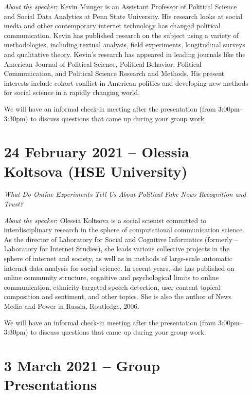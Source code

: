 \documentclass[abstract=on,parskip=full,headings=standardclasses,fontsize=11pt,paper=a4]{scrartcl}
\begin{document}
\textit{About the speaker}: Kevin Munger is an Assistant Professor of Political Science and Social Data Analytics at Penn State University. His research looks at social media and other contemporary internet technology has changed political communication. Kevin has published research on the subject using a variety of methodologies, including textual analysis, field experiments, longitudinal surveys and qualitative theory. Kevin's research has appeared in leading journals like the American Journal of Political Science, Political Behavior, Political Communication, and Political Science Research and Methods. His present interests include cohort conflict in American politics and developing new methods for social science in a rapidly changing world.
  
  
  
We will have an informal check-in meeting after the presentation (from 3:00pm--3:30pm) to discuss questions that came up during your group work.
  
  
\section{24 February 2021 -- Olessia Koltsova (HSE University)} 

\textit{What Do Online Experiments Tell Us About Political Fake News Recognition and Trust?}



\textit{About the speaker}: Olessia Koltsova is a social scienist committed to interdisciplinary research in the sphere of computational communication science. As the director of Laboratory for Social and Cognitive Informatics (formerly – Laboratory for Internet Studies), she leads various collective projects in the sphere of internet and society, as well as in methods of large-scale automatic internet data analysis for social science. In recent years, she has published on online community structure, cognitive and psychological limits to online communication, ethnicity-targeted speech detection, user content topical composition and sentiment, and other topics. She is also the author of News Media and Power in Russia, Routledge, 2006.
  
  
We will have an informal check-in meeting after the presentation (from 3:00pm--3:30pm) to discuss questions that came up during your group work.


\section{3 March 2021 -- Group Presentations}
\end{document}
